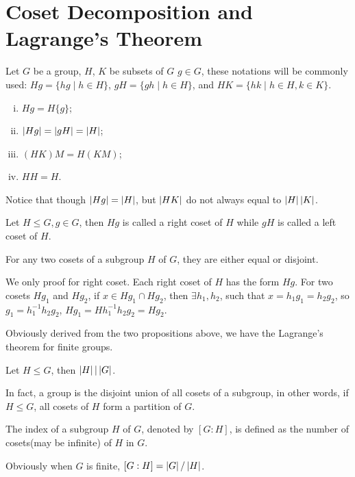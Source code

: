 \section{Coset Decomposition and Lagrange's Theorem}
Let $G$ be a group, $H$, $K$ be subsets of $G$ $g \in G$,
these notations will be commonly used:
$Hg=\{hg \mid h \in H\}$, $gH=\{gh \mid h \in H\}$,
and $HK=\{hk \mid h \in H, k \in K\}$.
\begin{pro}
\begin{enumerate}[i).]
\item $Hg=H\{g\}$;
\item $\left| {Hg} \right|=\left| {gH} \right|=\left| {H} \right|$;
\item $(HK)M=H(KM)$;
\item $HH = H$.
\end{enumerate}
\end{pro}
Notice that though $\left| {Hg} \right|=\left| {H} \right|$,
but $\left| {HK} \right|$ do not always equal to $\left| {H} \right|\left| {K} \right|$.
\begin{defi}
Let $H \leq G, g \in G$, then $Hg$ is called a right coset of $H$
while $gH$ is called a left coset of $H$.
\end{defi}
\begin{pro}
For any two cosets of a subgroup $H$ of $G$,
they are either equal or disjoint.
\end{pro}
\begin{prf}
We only proof for right coset.
Each right coset of $H$ has the form $Hg$.
For two cosets $Hg_1$ and $Hg_2$, if $x \in Hg_1 \cap Hg_2$,
then $\exists h_1, h_2$, such that $x=h_1g_1=h_2g_2$,
so $g_1=h_1^{-1}h_2g_2$, $Hg_1=Hh_1^{-1}h_2g_2=Hg_2$.
\end{prf}
Obviously derived from the two propositions above,
we have the Lagrange's theorem for finite groups.
\begin{thm}[Lagrange]
Let $H \leq G$, then $\left| {H} \right| \vert \left| {G} \right|$.
\end{thm}
In fact, a group is the disjoint union of all cosets of a subgroup,
in other words, if $H \leq G$, all cosets of $H$ form a partition of $G$.
\begin{defi}
The index of a subgroup $H$ of $G$, denoted by $[G:H]$, is defined as the number of cosets(may be infinite) of $H$ in $G$.
\end{defi}
Obviously when $G$ is finite, $[G:H] = \left| {G} \right| / \left| {H} \right|$.


